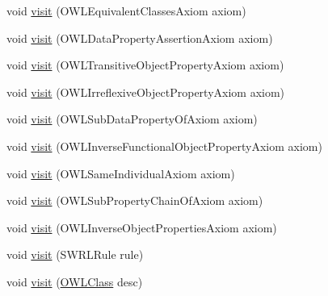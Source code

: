 \begin{DoxyCompactItemize}
\item 
void \hyperlink{classuk_1_1ac_1_1manchester_1_1cs_1_1owlapi_1_1dlsyntax_1_1_d_l_syntax_object_renderer_a59f01b47239094c5adef9c443b2002b7}{visit} (O\-W\-L\-Equivalent\-Classes\-Axiom axiom)
\item 
void \hyperlink{classuk_1_1ac_1_1manchester_1_1cs_1_1owlapi_1_1dlsyntax_1_1_d_l_syntax_object_renderer_a29f47fbae963849b79734aab1c50597a}{visit} (O\-W\-L\-Data\-Property\-Assertion\-Axiom axiom)
\item 
void \hyperlink{classuk_1_1ac_1_1manchester_1_1cs_1_1owlapi_1_1dlsyntax_1_1_d_l_syntax_object_renderer_a932e4c77daff19335ee92b7f1ec41fe4}{visit} (O\-W\-L\-Transitive\-Object\-Property\-Axiom axiom)
\item 
void \hyperlink{classuk_1_1ac_1_1manchester_1_1cs_1_1owlapi_1_1dlsyntax_1_1_d_l_syntax_object_renderer_abcd3dbadfef96c3201998bd21c4595fb}{visit} (O\-W\-L\-Irreflexive\-Object\-Property\-Axiom axiom)
\item 
void \hyperlink{classuk_1_1ac_1_1manchester_1_1cs_1_1owlapi_1_1dlsyntax_1_1_d_l_syntax_object_renderer_ae6b662563b28d19868f1cbd194d55fd1}{visit} (O\-W\-L\-Sub\-Data\-Property\-Of\-Axiom axiom)
\item 
void \hyperlink{classuk_1_1ac_1_1manchester_1_1cs_1_1owlapi_1_1dlsyntax_1_1_d_l_syntax_object_renderer_ab99f0d63ddce1b0a25e1bd481e8bdd3f}{visit} (O\-W\-L\-Inverse\-Functional\-Object\-Property\-Axiom axiom)
\item 
void \hyperlink{classuk_1_1ac_1_1manchester_1_1cs_1_1owlapi_1_1dlsyntax_1_1_d_l_syntax_object_renderer_ae47cc36f0f3a7003ed05be095e9085a9}{visit} (O\-W\-L\-Same\-Individual\-Axiom axiom)
\item 
void \hyperlink{classuk_1_1ac_1_1manchester_1_1cs_1_1owlapi_1_1dlsyntax_1_1_d_l_syntax_object_renderer_ae899f7b09eab9b698f3a216130964d02}{visit} (O\-W\-L\-Sub\-Property\-Chain\-Of\-Axiom axiom)
\item 
void \hyperlink{classuk_1_1ac_1_1manchester_1_1cs_1_1owlapi_1_1dlsyntax_1_1_d_l_syntax_object_renderer_accd0a6a79c6ccc5693010b30cad87ec9}{visit} (O\-W\-L\-Inverse\-Object\-Properties\-Axiom axiom)
\item 
void \hyperlink{classuk_1_1ac_1_1manchester_1_1cs_1_1owlapi_1_1dlsyntax_1_1_d_l_syntax_object_renderer_a2652337f17bed661780c78bb8531b2e2}{visit} (S\-W\-R\-L\-Rule rule)
\item 
void \hyperlink{classuk_1_1ac_1_1manchester_1_1cs_1_1owlapi_1_1dlsyntax_1_1_d_l_syntax_object_renderer_a99153a23ab187c73f9cc67a20a14912f}{visit} (\hyperlink{interfaceorg_1_1semanticweb_1_1owlapi_1_1model_1_1_o_w_l_class}{O\-W\-L\-Class} desc)

\end{DoxyCompactItemize}
